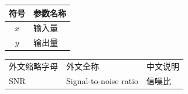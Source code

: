 \ifMasterShowSymbols
  \begin{center}
  \begin{MasterTable}
  \begin{tabular}{|c|l|}
    \hline
    符号 & 参数名称 \\ \hline
    $x$ & 输入量 \\ \hline
    $y$ & 输出量 \\ \hline
  \end{tabular}
  \end{MasterTable}
  \end{center}
\fi

\ifMasterShowAbbreviations
  \begin{center}
  \begin{MasterTable}
  \begin{tabular}{lll}
    外文缩略字母 & 外文全称 & 中文说明 \\
    SNR & Signal-to-noise ratio & 信噪比 \\
  \end{tabular}
  \end{MasterTable}
  \end{center}
\fi
